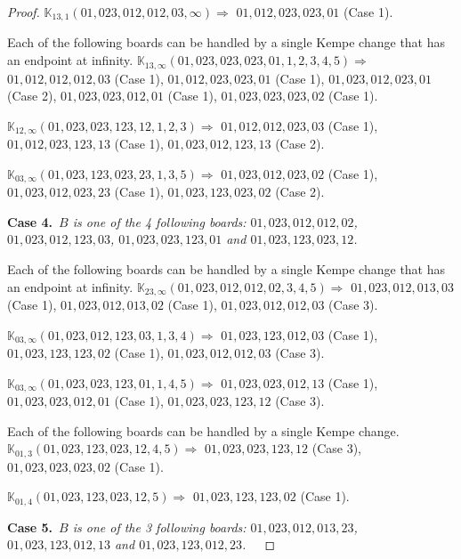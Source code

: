 \documentclass[12pt]{article}
\newcommand{\K}{\mathbb{K}}
\newcommand{\case}[2]{{\bf Case #1.}~{\it #2}~~}
\begin{document}
\begin{proof}
$\K_{13,1}(01,023,012,012,03,\infty)\Rightarrow $ $01,012,023,023,01$ (Case 1).


\bigskip

Each of the following boards can be handled by a single Kempe change that has an endpoint at infinity.
$\K_{13,\infty}(01,023,023,023,01,1, 2, 3, 4, 5)\Rightarrow $ $01,012,012,012,03$ (Case 1), $01,012,023,023,01$ (Case 1), $01,023,012,023,01$ (Case 2), $01,023,023,012,01$ (Case 1), $01,023,023,023,02$ (Case 1).

\bigskip

$\K_{12,\infty}(01,023,023,123,12,1, 2, 3)\Rightarrow $ $01,012,012,023,03$ (Case 1), $01,012,023,123,13$ (Case 1), $01,023,012,123,13$ (Case 2).

\bigskip

$\K_{03,\infty}(01,023,123,023,23,1, 3, 5)\Rightarrow $ $01,023,012,023,02$ (Case 1), $01,023,012,023,23$ (Case 1), $01,023,123,023,02$ (Case 2).

\bigskip


\bigskip
\case{4}{$B$ is one of the 4 following boards:
 $01,023,012,012,02$, $01,023,012,123,03$, $01,023,023,123,01$ and $01,023,123,023,12$.}

\bigskip

Each of the following boards can be handled by a single Kempe change that has an endpoint at infinity.
$\K_{23,\infty}(01,023,012,012,02,3, 4, 5)\Rightarrow $ $01,023,012,013,03$ (Case 1), $01,023,012,013,02$ (Case 1), $01,023,012,012,03$ (Case 3).

\bigskip

$\K_{03,\infty}(01,023,012,123,03,1, 3, 4)\Rightarrow $ $01,023,123,012,03$ (Case 1), $01,023,123,123,02$ (Case 1), $01,023,012,012,03$ (Case 3).

\bigskip

$\K_{03,\infty}(01,023,023,123,01,1, 4, 5)\Rightarrow $ $01,023,023,012,13$ (Case 1), $01,023,023,012,01$ (Case 1), $01,023,023,123,12$ (Case 3).

\bigskip

\bigskip

Each of the following boards can be handled by a single Kempe change.
$\K_{01,3}(01,023,123,023,12,4, 5)\Rightarrow $ $01,023,023,123,12$ (Case 3), $01,023,023,023,02$ (Case 1).

$\K_{01,4}(01,023,123,023,12,5)\Rightarrow $ $01,023,123,123,02$ (Case 1).


\bigskip


\bigskip
\case{5}{$B$ is one of the 3 following boards:
 $01,023,012,013,23$, $01,023,123,012,13$ and $01,023,123,012,23$.}


\end{proof}
\end{document}
